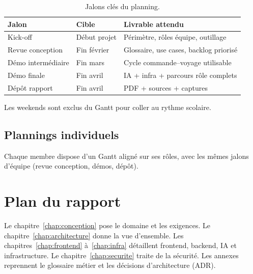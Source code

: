 \begin{table}[H]
\centering
\caption{Jalons clés du planning.}
\label{tab:jalons}
\small
\begin{tabular}{@{}llp{7.2cm}@{}}
\toprule
Jalon & Cible & Livrable attendu \\
\midrule
Kick-off & Début projet & Périmètre, rôles équipe, outillage \\
Revue conception & Fin février & Glossaire, use cases, backlog priorisé \\
Démo intermédiaire & Fin mars & Cycle commande--voyage utilisable \\
Démo finale & Fin avril & IA + infra + parcours rôle complets \\
Dépôt rapport & Fin avril & PDF + sources + captures \\
\bottomrule
\end{tabular}
\end{table}

Les weekends sont exclus du Gantt pour coller au rythme scolaire.

\subsection{Plannings individuels}

Chaque membre dispose d'un Gantt aligné sur ses rôles, avec les mêmes jalons d'équipe (revue conception, démos, dépôt).





\section{Plan du rapport}

Le chapitre~\ref{chap:conception} pose le domaine et les exigences. Le chapitre~\ref{chap:architecture} donne la vue d'ensemble. Les chapitres~\ref{chap:frontend} à~\ref{chap:infra} détaillent frontend, backend, IA et infrastructure. Le chapitre~\ref{chap:securite} traite de la sécurité. Les annexes reprennent le glossaire métier et les décisions d'architecture (ADR).
